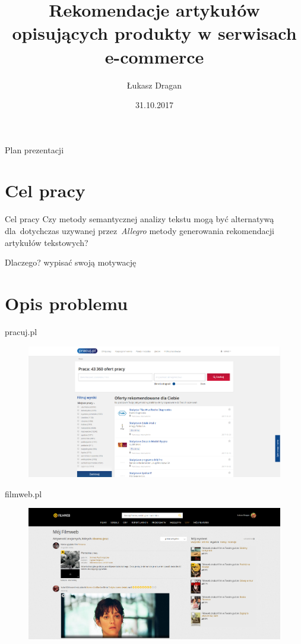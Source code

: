 \documentclass{beamer}
\title[Praca magisterska]{Rekomendacje artykułów opisujących produkty w serwisach e-commerce}
\author{Łukasz Dragan}
\institute{Informatyka spec. Metody sztucznej inteligencji, MiNI PW}
\date{31.10.2017}
\begin{document}
	
	\begin{frame}
		\titlepage
	\end{frame}
	
	\begin{frame}{Plan prezentacji}
	  \tableofcontents
	\end{frame}
	
	\section{Cel pracy}
		\begin{frame}{Cel pracy}
			Czy metody semantycznej analizy tekstu mogą być alternatywą dla~dotychczas uzywanej przez~\emph{Allegro} metody generowania rekomendacji artykułów tekstowych?
		\end{frame}
		\begin{frame}{Dlaczego?}
			wypisać swoją motywację
		\end{frame}
	\section{Opis problemu}
	
	\begin{frame}{pracuj.pl}
		\begin{figure}
			\centering
			\includegraphics[width=1\textwidth]{img/pracuj.png}
		\end{figure}
	\end{frame}
	
	\begin{frame}{filmweb.pl}
		\begin{figure}
			\centering
			\includegraphics[width=1\textwidth]{img/filmweb.png}
		\end{figure}
	\end{frame}
	
\end{document}
